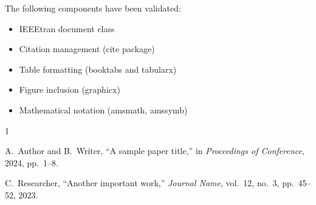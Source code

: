 \documentclass[conference]{IEEEtran}
\begin{document}
The following components have been validated:
\begin{itemize}
\item IEEEtran document class
\item Citation management (cite package)
\item Table formatting (booktabs and tabularx)
\item Figure inclusion (graphicx)
\item Mathematical notation (amsmath, amssymb)
\end{itemize}

\begin{thebibliography}{1}

A.~Author and B.~Writer, ``A sample paper title,'' in \textit{Proceedings of Conference}, 2024, pp.~1--8.

C.~Researcher, ``Another important work,'' \textit{Journal Name}, vol.~12, no.~3, pp.~45--52, 2023.

\end{thebibliography}
\end{document}

